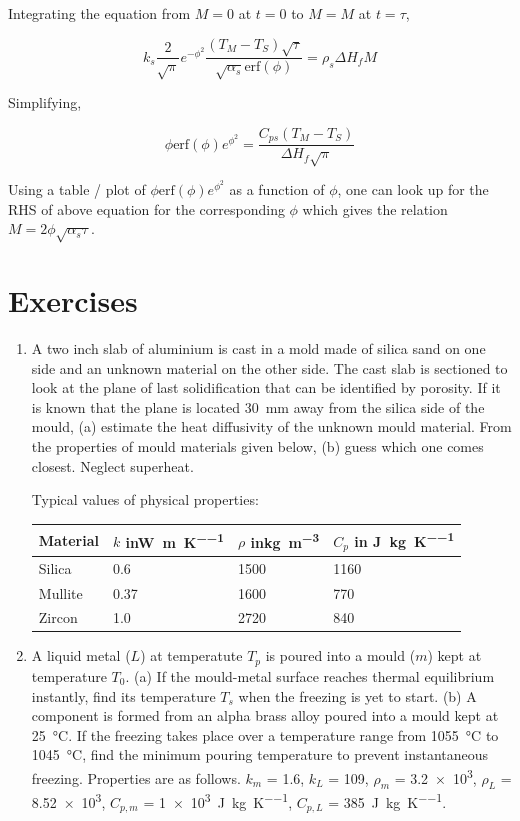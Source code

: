 Integrating the equation from $M=0$ at $t=0$ to $M=M$ at $t=\tau$,

$$
 k_s \frac{2}{\sqrt{\pi}} e^{-\phi^2} \frac {(T_M-T_S)
\sqrt{\tau}}{\sqrt{\alpha_s} \text{erf}(\phi) } = \rho_s \Delta H_f M
$$

Simplifying,

$$
\boxed{
\phi \text{erf}(\phi) e^{\phi^2}  = \frac{C_{ps}(T_M-T_S)}{\Delta H_f
\sqrt{\pi}} 
}
$$

Using a table / plot of $\phi \text{erf}(\phi) e^{\phi^2}$ as a function of
$\phi$, one can look up for the RHS of above equation for the corresponding
$\phi$ which gives the relation $M = 2 \phi \sqrt{\alpha_s \tau}$.

\pagebreak
\section{Exercises}
 
\begin{enumerate}
 \item A two inch slab of aluminium is cast in a mold made of silica sand on one
side and an unknown material on the other side. The cast slab is sectioned to
look at the plane of last solidification that can be identified by porosity. If
it is known that the plane is located \SI{30}{\milli\metre} away from the silica side of
the mould, (a) estimate the heat diffusivity of the unknown mould material. From
the properties of mould materials given below, (b) guess which one comes
closest. Neglect superheat.


Typical values of physical properties:\\
\begin{tabular}{|l|l|l|l|}
\hline
Material & $k$ in\si{\watt\per\metre\per\kelvin} & $\rho$
in\si{\kilo\gram\per\metre\cubed} & $C_p$ in
\si{\joule\per\kilo\gram\per\kelvin} \\
\hline
Silica & 0.6 & 1500 & 1160  \\
Mullite & 0.37 & 1600 & 770  \\
Zircon & 1.0 & 2720 & 840  \\
\hline
\end{tabular}



\item A liquid metal ($L$) at temperatute $T_p$ is poured into a mould ($m$)
kept at temperature $T_0$. (a) If the mould-metal surface reaches thermal
equilibrium instantly, find its temperature $T_s$ when the freezing is yet to
start. (b) A component is formed from an alpha brass alloy poured into a mould
kept at \SI{25}{\celsius}. If the freezing takes place over a temperature range
from \SI{1055}{\celsius} to \SI{1045}{\celsius}, find the minimum pouring
temperature to prevent instantaneous freezing. Properties are as follows. $k_m$
= \SI{1.6}{\wpmk}, $k_L$ = \SI{109}{\wpmk}, $\rho_m$ = \SI{3.2e3}{\kgpmc},
$\rho_L$ = \SI{8.52e3}{\kgpmc}, $C_{p,m}$ =
\SI{1e3}{\joule\per\kilo\gram\per\kelvin}, $C_{p,L}$ =
\SI{385}{\joule\per\kilo\gram\per\kelvin}.

\end{enumerate}
